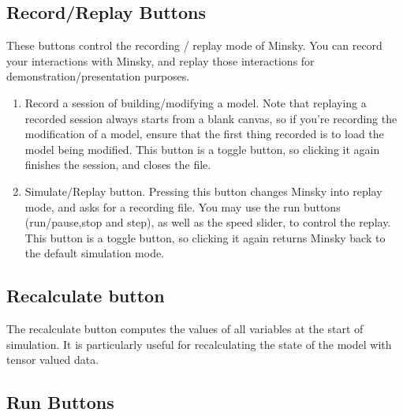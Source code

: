 \subsection{Record/Replay Buttons}

\label{RecReplayButtons}


These buttons control the recording / replay mode of Minsky. You can
record your interactions with Minsky, and replay those interactions
for demonstration/presentation purposes.
\begin{enumerate}
\item Record a session of building/modifying a model. Note that replaying
a recorded session always starts from a blank canvas, so if you're
recording the modification of a model, ensure that the first thing
recorded is to load the model being modified. This button is a toggle
button, so clicking it again finishes the session, and closes the
file. 
\item Simulate/Replay button. Pressing this button changes Minsky into replay
mode, and asks for a recording file. You may use the run buttons (run/pause,stop
and step), as well as the speed slider, to control the replay. This
button is a toggle button, so clicking it again returns Minsky back
to the default simulation mode. 
\end{enumerate}

\subsection{Recalculate button}

\label{Recalculate}


The recalculate button computes the values of all variables at the
start of simulation. It is particularly useful for recalculating the
state of the model with tensor valued data.

\subsection{Run Buttons}

\label{RunButtons}


